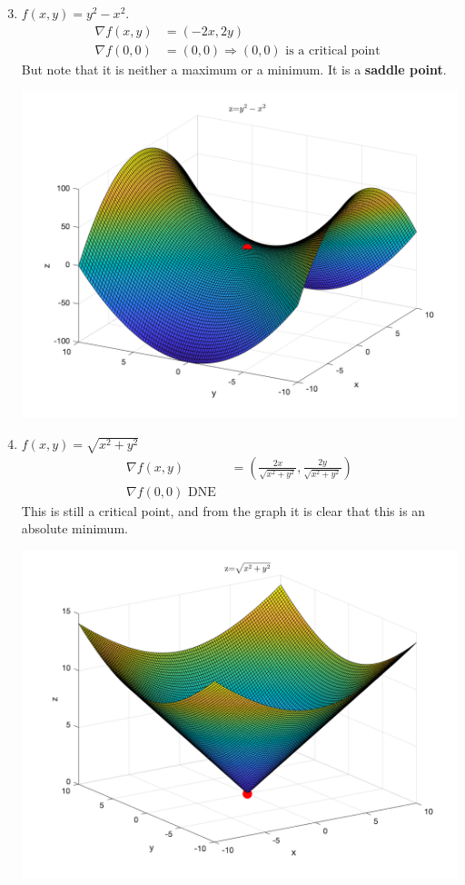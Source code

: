 \documentclass[11pt]{article}
\begin{document}
\begin{enumerate}[ (i) ]
\setcounter{enumi}{2}
\item $f(x, y) = y^2 - x^2$.
\begin{align*}
\nabla f(x, y) &= (-2x, 2y) \\
\nabla f(0, 0) &= (0, 0) \Rightarrow (0, 0) \text{ is a critical point }
\end{align*}
But note that it is neither a maximum or a minimum. It is a \textbf{saddle point}.

\begin{center}
\includegraphics[scale=0.25]{eg3}
\end{center}

\item $f(x, y) = \sqrt{x^2 + y^2}$
\begin{align*}
\nabla f(x, y) &= (\frac{2x}{\sqrt{x^2 + y^2}}, \frac{2y}{\sqrt{x^2 + y^2}}) \\
\nabla f(0, 0) \text{ DNE }
\end{align*}
This is still a critical point, and from the graph it is clear that this is an absolute minimum.

\begin{center}
\includegraphics[scale=0.25]{eg4}
\end{center}

\end{enumerate}
\end{document}

